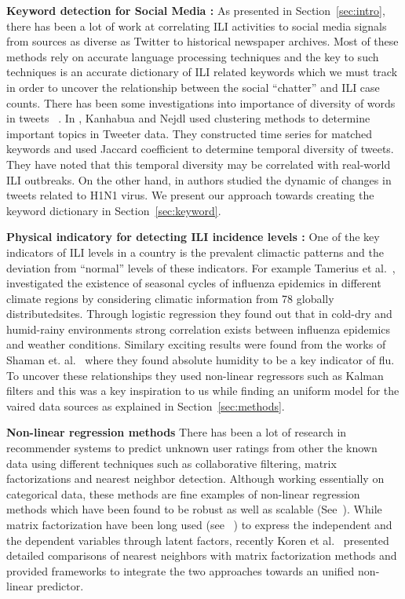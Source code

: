 \textbf{Keyword detection for Social Media :} 
As presented in Section~\ref{sec:intro}, there has been a lot of 
work at correlating ILI activities to social media signals from sources as diverse 
as Twitter to historical newspaper archives. Most of these methods rely on 
accurate language processing techniques and the key to such techniques is an 
accurate dictionary of ILI related keywords which we must track in order to 
uncover the relationship between the social ``chatter'' and ILI case counts. 
There has been some investigations into importance of diversity of words
in tweets ~\cite{ref5, ref6}. In
\cite{ref5}, Kanhabua and Nejdl used clustering methods to determine
important topics in Tweeter data. They constructed time series for
matched keywords and used Jaccard coefficient to determine temporal
diversity of tweets. They have noted that this temporal diversity may be
correlated with real-world ILI outbreaks. On the other hand, in \cite{ref6}
authors studied the dynamic of changes in tweets related to H1N1 virus. We 
present our approach towards creating the keyword dictionary in Section~\ref{sec:keyword}.

\textbf{ Physical indicatory for detecting ILI incidence levels :} 
One of the key indicators of ILI levels in a country is the prevalent 
climactic patterns and the deviation from ``normal'' levels of these 
indicators. For example Tamerius et al.~\cite{ref9}, investigated the existence of seasonal 
cycles of influenza epidemics in different climate regions
by considering
climatic information from 78 globally distributedsites. Through logistic
regression they found out that in cold-dry and humid-rainy
environments strong correlation exists between influenza epidemics and
weather conditions. Similary exciting results were found from the works
of Shaman et. al.~\cite{Shaman_orig_humidity_link, Shaman_humidity_USA}
where they found absolute humidity to be a key indicator of flu. To uncover 
these relationships they used non-linear regressors such as Kalman filters 
and this was a key inspiration to us while finding an uniform model for the
vaired data sources as explained in Section~\ref{sec:methods}.

\textbf{Non-linear regression methods}
There has been a lot of research in recommender systems to predict unknown user 
ratings from other the known data using different techniques such as collaborative 
filtering, matrix factorizations and nearest neighbor detection. Although
working essentially on categorical data, these methods are fine examples of non-linear
regression methods which have been found to be robust as well as scalable (See~\cite{koren2008factor}).
While matrix factorization have been long used (see ~\cite{canny2002factor}) to 
express the independent and the dependent variables through latent factors, 
recently Koren et al.~\cite{koren2008factor} presented detailed comparisons
of nearest neighbors with matrix factorization methods and provided frameworks to 
integrate the two approaches towards an unified non-linear predictor.

